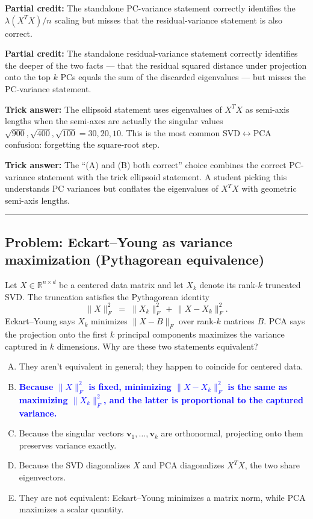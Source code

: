 \documentclass[12pt]{amsart}
\newcommand{\divider}{
  \vspace{-1em}
  \noindent
  \raisebox{-0.15ex}{\textbullet}%
  \hspace{0.5em}%
  \rule[0.5ex]{0.95\textwidth}{1.0pt}%
  \hspace{0.5em}%
  \raisebox{-0.15ex}{\textbullet}%
  \vspace{0em}
}
\begin{document}
\textbf{Partial credit:}
The standalone PC-variance statement correctly identifies the
$\lambda(X^TX)/n$ scaling but misses that the residual-variance statement
is also correct.

\textbf{Partial credit:}
The standalone residual-variance statement correctly identifies the
deeper of the two facts --- that the residual squared distance under
projection onto the top $k$ PCs equals the sum of the discarded eigenvalues ---
but misses the PC-variance statement.

\textbf{Trick answer:}
The ellipsoid statement uses eigenvalues of $X^TX$ as semi-axis lengths
when the semi-axes are actually the singular values
$\sqrt{900}, \sqrt{400}, \sqrt{100} = 30, 20, 10$.
This is the most common SVD$\leftrightarrow$PCA confusion: forgetting
the square-root step.

\textbf{Trick answer:}
The ``(A) and (B) both correct'' choice combines the correct PC-variance
statement with the trick ellipsoid statement. A student picking this
understands PC variances but conflates the eigenvalues of $X^TX$ with
geometric semi-axis lengths.

\divider

\subsection*{Problem: Eckart--Young as variance maximization (Pythagorean equivalence)}

Let $X \in \mathbb{R}^{n \times d}$ be a centered data matrix and let $X_k$
denote its rank-$k$ truncated SVD. The truncation satisfies the Pythagorean
identity
$$\|X\|_F^2 \;=\; \|X_k\|_F^2 \,+\, \|X - X_k\|_F^2.$$
Eckart--Young says $X_k$ minimizes $\|X - B\|_F$ over rank-$k$ matrices $B$.
PCA says the projection onto the first $k$ principal components maximizes
the variance captured in $k$ dimensions. Why are these two statements equivalent?

\begin{enumerate}[(A)]
\item They aren't equivalent in general; they happen to coincide for centered data.
\item \textcolor{blue}{\textbf{Because $\|X\|_F^2$ is fixed, minimizing $\|X - X_k\|_F^2$ is the same as maximizing $\|X_k\|_F^2$, and the latter is proportional to the captured variance.}}
\item Because the singular vectors $\mathbf{v}_1, \ldots, \mathbf{v}_k$ are
orthonormal, projecting onto them preserves variance exactly.
\item Because the SVD diagonalizes $X$ and PCA diagonalizes $X^TX$, the two
share eigenvectors.
\item They are not equivalent: Eckart--Young minimizes a matrix norm,
while PCA maximizes a scalar quantity.
\end{enumerate}
\end{document}

